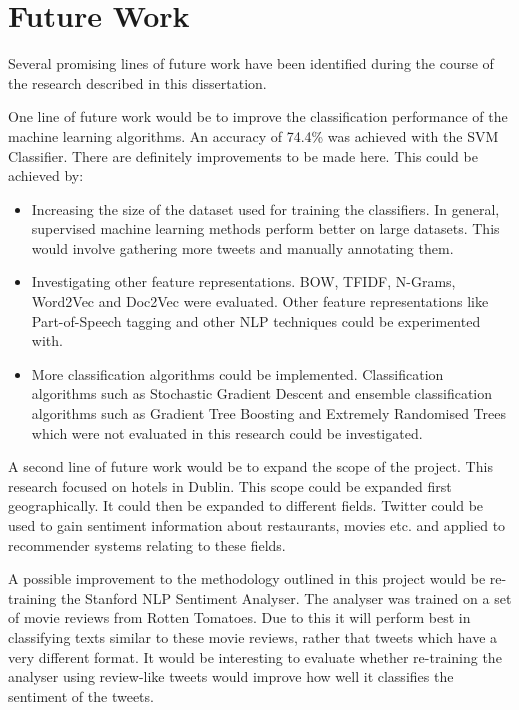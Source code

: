 \section{Future Work}

Several promising lines of future work have been identified during the course of the research described in this dissertation.

One line of future work would be to improve the classification performance of the machine learning algorithms. An accuracy of 74.4\% was achieved with the SVM Classifier. There are definitely improvements to be made here. This could be achieved by:
\begin{itemize}
    \item Increasing the size of the dataset used for training the classifiers. In general, supervised machine learning methods perform better on large datasets. This would involve gathering more tweets and manually annotating them.
    \item Investigating other feature representations. BOW, TFIDF, N-Grams, Word2Vec and Doc2Vec were evaluated. Other feature representations like Part-of-Speech tagging and other NLP techniques could be experimented with.
    \item More classification algorithms could be implemented. Classification algorithms such as Stochastic Gradient Descent and ensemble classification algorithms such as Gradient Tree Boosting and Extremely Randomised Trees which were not evaluated in this research could be investigated. 
\end{itemize}

A second line of future work would be to expand the scope of the project. This research focused on hotels in Dublin. This scope could be expanded first geographically. It could then be expanded to different fields. Twitter could be used to gain sentiment information about restaurants, movies etc. and applied to recommender systems relating to these fields.

A possible improvement to the methodology outlined in this project would be re-training the Stanford NLP Sentiment Analyser. The analyser was trained on a set of movie reviews from Rotten Tomatoes. Due to this it will perform best in classifying texts similar to these movie reviews, rather that tweets which have a very different format. It would be interesting to evaluate whether re-training the analyser using review-like tweets would improve how well it classifies the sentiment of the tweets. 

